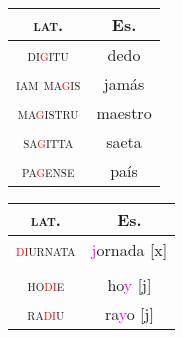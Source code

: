 \documentclass{report}
\begin{document}
\begin{tcolorbox}[title=Deaspiration]
  
\end{tcolorbox}

\begin{tcolorbox}[title=Nasal Spirant Law]

\end{tcolorbox}

\begin{tcolorbox}[title=Elision of Intervocalic /g/]

\end{tcolorbox}

\begin{tabular}{c c}
  \textsc{lat.} & Es. \\
  \hline
  \textsc{di\textcolor{red}{g}itu} & dedo \\
  \textsc{iam ma\textcolor{red}{g}is} & jamás \\
  \textsc{ma\textcolor{red}{g}istru} & maestro \\
  \textsc{sa\textcolor{red}{g}itta} & saeta \\
  \textsc{pa\textcolor{red}{g}ense} & país \\
\end{tabular}

\begin{tcolorbox}[title=Elision of Coda /m/]
  
\end{tcolorbox}

\begin{tcolorbox}[title=Palatalization and Affrication of Dentals]

\end{tcolorbox}

\begin{tabular}{c c}
  \textsc{lat.} & Es. \\
  \hline
  \textsc{\textcolor{red}{di}urnata} & \textcolor{magenta}{j}ornada [x] \\
                & \\
  \textsc{ho\textcolor{red}{di}e} & ho\textcolor{magenta}{y} [j] \\
  \textsc{ra\textcolor{red}{di}u} & ra\textcolor{magenta}{y}o [j] \\
\end{tabular}

\begin{tcolorbox}[title=Palatalization of Velars]

\end{tcolorbox}
\end{document}
